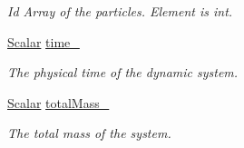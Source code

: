 \begin{DoxyCompactItemize}
\begin{DoxyCompactList}\small\item\em Id Array of the particles. Element is int. \end{DoxyCompactList}\item 
\mbox{\hyperlink{classparticles_a57a6b6582045a4b20742b99c513e9f63}{Scalar}} \mbox{\hyperlink{classparticles_a0ea87eff27f700bcaf20734b22d88d53}{time\+\_\+}}
\begin{DoxyCompactList}\small\item\em The physical time of the dynamic system. \end{DoxyCompactList}\item 
\mbox{\hyperlink{classparticles_a57a6b6582045a4b20742b99c513e9f63}{Scalar}} \mbox{\hyperlink{classparticles_ab84755685f1e8c6f3a2ea17c604049e0}{total\+Mass\+\_\+}}
\begin{DoxyCompactList}\small\item\em The total mass of the system. \end{DoxyCompactList}\end{DoxyCompactItemize}
